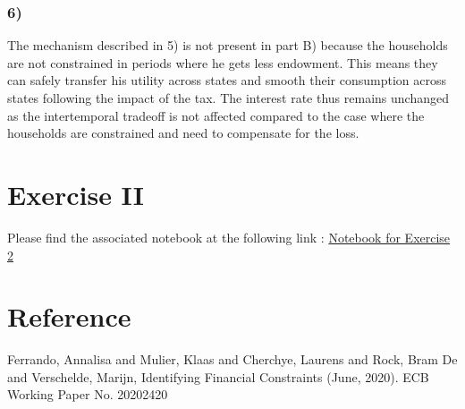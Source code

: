 \documentclass{article}
\begin{document}
\subsubsection{6)}
The mechanism described in 5) is not present in part B) because the households are not constrained in periods where he gets less endowment. This means they can safely transfer his utility across states and smooth their consumption across states following the impact of the tax. The interest rate thus remains unchanged as the intertemporal tradeoff is not affected compared to the case where the households are constrained and need to compensate for the loss. 

\section{Exercise II}
Please find the associated notebook at the following link :  \href{https://pluto.land/n/5hvn1ssv}{Notebook for Exercise 2} 


\section{Reference}
Ferrando, Annalisa and Mulier, Klaas and Cherchye, Laurens and Rock, Bram De and Verschelde, Marijn, Identifying Financial Constraints (June, 2020). ECB Working Paper No. 20202420
\end{document}

